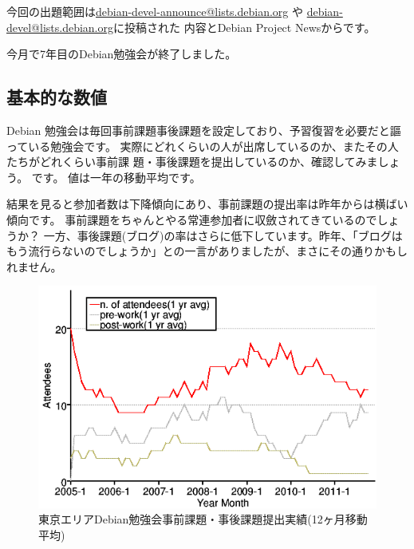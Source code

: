\documentclass[mingoth,a4paper]{jsarticle}
\begin{document}
今回の出題範囲は\url{debian-devel-announce@lists.debian.org} や \url{debian-devel@lists.debian.org}に投稿された
内容とDebian Project Newsからです。
\begin{multicols}{2}
 
\end{multicols}


今月で7年目のDebian勉強会が終了しました。

\subsection{基本的な数値}

Debian 勉強会は毎回事前課題事後課題を設定しており、予習復習を必要だと謳っている勉強会です。
実際にどれくらいの人が出席しているのか、またその人たちがどれくらい事前課
題・事後課題を提出しているのか、確認してみましょう。
です。
値は一年の移動平均です。

結果を見ると参加者数は下降傾向にあり、事前課題の提出率は昨年からは横ばい傾向です。
事前課題をちゃんとやる常連参加者に収斂されてきているのでしょうか？
一方、事後課題(ブログ)の率はさらに低下しています。昨年、「ブログはもう流行らないのでしょうか」との一言がありましたが、まさにその通りかもしれません。

\begin{figure}[ht]
\begin{center}
 \includegraphics[width=0.7\hsize]{image201112/memberanalysis/attend.png}
\caption{東京エリアDebian勉強会事前課題・事後課題提出実績(12ヶ月移動平均)}\label{fig:attendandprepostwork}
\end{center}
\end{figure}
\end{document}
